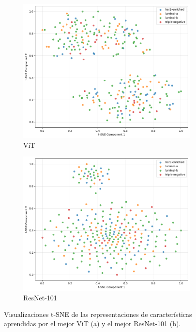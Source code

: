 \documentclass[a4paper,10pt]{book}
\begin{document}
\begin{figure}[h!]
    \centering
    \begin{subfigure}[t]{0.48\textwidth}
        \centering
        \includegraphics[width=\textwidth]{reports/assets/TSNE-VIT.png}
        \caption{ViT}
        \label{fig:tsne_vit}
    \end{subfigure}
    \begin{subfigure}[t]{0.48\textwidth}
        \centering
        \includegraphics[width=\textwidth]{reports/assets/TSNE-ResNet.png}
        \caption{ResNet-101}
        \label{fig:tsne_resnet}
    \end{subfigure}
    \caption[Visualizaciones t-SNE Mejor ViT vs. Mejor ResNet-101]{Visualizaciones t-SNE de las representaciones de características aprendidas por el mejor ViT (a) y el mejor ResNet-101 (b).}
    \label{fig:tsne_vit_resnet}
\end{figure}
\end{document}
